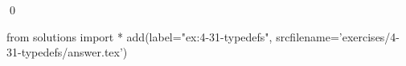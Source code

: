 
\begin{ex}
  \label{ex:4-31-typedefs}
  
  \qed
\end{ex}
\begin{python0}
from solutions import *
add(label="ex:4-31-typedefs",
    srcfilename='exercises/4-31-typedefs/answer.tex')
\end{python0}
